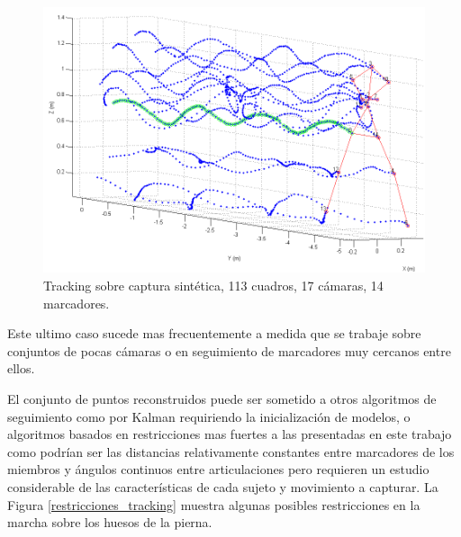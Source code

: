 \begin{figure}[ht!]
\vspace{-0.4cm}
\begin{center}
\includegraphics[scale=0.4]{imagenes/Seguimiento/040_Salida_Tracking_Esqueleto_Trayectoria.png}
\end{center}
\vspace{-0.5cm}
\caption{Tracking sobre captura sintética, 113 cuadros, 17 cámaras, 14 marcadores.}
\label{Tracking_Esqueleto_Trayectoria}
\end{figure}

Este ultimo caso sucede mas frecuentemente a medida que se trabaje sobre conjuntos de pocas cámaras o en seguimiento de marcadores muy cercanos entre ellos. 

El conjunto de puntos reconstruidos puede ser sometido a otros algoritmos de seguimiento como por Kalman \cite{kalman} requiriendo la inicialización de modelos, o algoritmos basados en restricciones mas fuertes a las presentadas en este trabajo como podrían ser las distancias relativamente constantes entre marcadores de los miembros y ángulos continuos entre articulaciones pero requieren un estudio considerable de las características de cada sujeto y movimiento a capturar. La Figura \ref{restricciones_tracking} muestra algunas posibles restricciones en la marcha sobre los huesos de la pierna.


